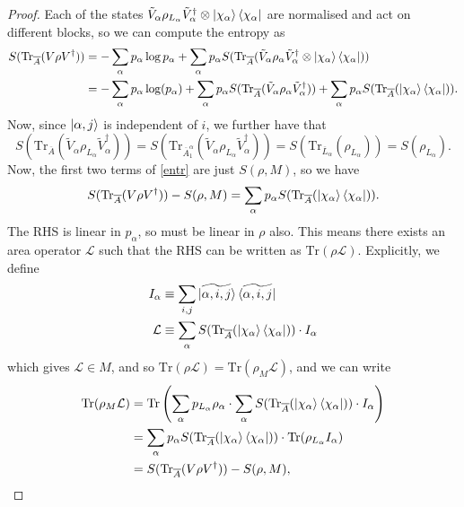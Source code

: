 \documentclass[12pt,a4paper]{report}
\numberwithin{equation}{section}
\newcommand{\ketbra}[2]{\ket{#1}\bra{#2}}
\newcommand{\ketbras}[1]{\ketbra{#1}{#1}}
\newcommand{\ol}[1]{\overline{#1}}
\theoremstyle{definition}
\theoremstyle{theorem}
\theoremstyle{theorem}
\theoremstyle{example}
\theoremstyle{definition}
\begin{document}
\begin{proof}
	Each of the states $\tilde{V}_{\alpha}\rho_{L_{\alpha}}\tilde{V}_{\alpha}^{\dagger}\otimes\ketbras{\chi_{\alpha}}$ are normalised and act on different blocks, so we can compute the entropy as
	\begin{equation}\label{entr}
		\begin{aligned}
			S(\text{Tr}_{\ol{A}}(V\rho V^{\dagger}))&=-\sum_{\alpha}p_{\alpha}\log{p_{\alpha}}+\sum_{\alpha}p_{\alpha}S(\text{Tr}_{\ol{A}}(\tilde{V}_{\alpha}\rho_{\alpha}\tilde{V}_{\alpha}^{\dagger}\otimes\ketbras{\chi_{\alpha}}))\\&=-\sum_{\alpha}p_{\alpha}\log(p_{\alpha})+\sum_{\alpha}p_{\alpha}S(\text{Tr}_{\ol{A}}(\tilde{V}_{\alpha}\rho_{\alpha}\tilde{V}_{\alpha}^{\dagger}))+\sum_{\alpha}p_{\alpha}S(\text{Tr}_{\ol{A}}(\ketbras{\chi_{\alpha}})).
		\end{aligned}
	\end{equation}
	Now, since $\ket{\alpha,j}$ is independent of $i$, we further have that
	\begin{equation}
		S(\text{Tr}_{\ol{A}}(\tilde{V}_{\alpha}\rho_{L_{\alpha}}\tilde{V}_{\alpha}^{\dagger}))=S(\text{Tr}_{\ol{A}_{1}^{\alpha}}(\tilde{V}_{\alpha}\rho_{L_{\alpha}}\tilde{V}_{\alpha}^{\dagger}))=S(\text{Tr}_{\ol{L}_{\alpha}}(\rho_{L_{\alpha}}))=S(\rho_{L_{\alpha}}).
	\end{equation}
	Now, the first two terms of \ref{entr} are just $S(\rho,M)$, so we have
	\begin{equation}
		S(\text{Tr}_{\ol{A}}(V\rho V^{\dagger}))-S(\rho,M)=\sum_{\alpha}p_{\alpha}S(\text{Tr}_{\ol{A}}(\ketbras{\chi_{\alpha}})).
	\end{equation}
	The RHS is linear in $p_{\alpha}$, so must be linear in $\rho$ also. This means there exists an area operator $\mathcal{L}$ such that the RHS can be written as $\text{Tr}(\rho\mathcal{L})$. Explicitly, we define
	\begin{equation}
		\begin{aligned}
			I_{\alpha}&\equiv \sum_{i,j}\ketbras{\widetilde{\alpha,i,j}}\\
			\mathcal{L}&\equiv\sum_{\alpha}S(\text{Tr}_{\ol{A}}(\ketbras{\chi_{\alpha}}))\cdot I_{\alpha}
		\end{aligned}
	\end{equation}
	which gives $\mathcal{L}\in M$, and so $\text{Tr}(\rho\mathcal{L})=\text{Tr}(\rho_{M}\mathcal{L})$, and we can write
	\begin{equation}
		\begin{aligned}
			\text{Tr}(\rho_{M}\mathcal{L})&=\text{Tr}\left(\sum_{\alpha}p_{L_{\alpha}}\rho_{\alpha}\cdot\sum_{\alpha}S(\text{Tr}_{\ol{A}}(\ketbras{\chi_{\alpha}}))\cdot I_{\alpha}\right)\\&=\sum_{\alpha}p_{\alpha}S(\text{Tr}_{\ol{A}}(\ketbras{\chi_{\alpha}}))\cdot \text{Tr}(\rho_{L_{\alpha}}I_{\alpha})\\&=S(\text{Tr}_{\ol{A}}(V\rho V^{\dagger}))-S(\rho,M),

\end{aligned}
\end{equation}
\end{proof}
\end{document}
